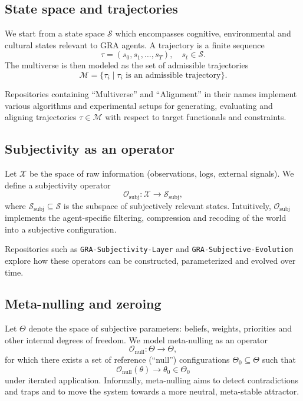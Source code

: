 \documentclass[11pt,a4paper]{article}
\begin{document}
\subsection{State space and trajectories}

We start from a state space $\mathcal{S}$ which encompasses cognitive,
environmental and cultural states relevant to GRA agents.
A trajectory is a finite sequence
\[
  \tau = (s_0, s_1, \dots, s_T), \quad s_t \in \mathcal{S}.
\]
The multiverse is then modeled as the set of admissible trajectories
\[
  \mathcal{M} = \{ \tau_i \mid \tau_i \text{ is an admissible trajectory} \}.
\]

Repositories containing ``Multiverse'' and ``Alignment'' in their names
implement various algorithms and experimental setups for generating,
evaluating and aligning trajectories $\tau \in \mathcal{M}$ with respect
to target functionals and constraints.

\subsection{Subjectivity as an operator}

Let $\mathcal{X}$ be the space of raw information (observations, logs,
external signals).
We define a subjectivity operator
\[
  \mathcal{O}_{\text{subj}} : \mathcal{X} \rightarrow \mathcal{S}_{\text{subj}},
\]
where $\mathcal{S}_{\text{subj}} \subseteq \mathcal{S}$ is the subspace
of subjectively relevant states.
Intuitively, $\mathcal{O}_{\text{subj}}$ implements the agent-specific
filtering, compression and recoding of the world into a subjective
configuration.

Repositories such as \texttt{GRA-Subjectivity-Layer} and
\texttt{GRA-Subjective-Evolution} explore how these operators can be
constructed, parameterized and evolved over time.

\subsection{Meta-nulling and zeroing}

Let $\Theta$ denote the space of subjective parameters:
beliefs, weights, priorities and other internal degrees of freedom.
We model meta-nulling as an operator
\[
  \mathcal{O}_{\text{null}} : \Theta \rightarrow \Theta,
\]
for which there exists a set of reference (``null'') configurations
$\Theta_0 \subseteq \Theta$ such that
\[
  \mathcal{O}_{\text{null}}(\theta) \rightarrow \theta_0 \in \Theta_0
\]
under iterated application.
Informally, meta-nulling aims to detect contradictions and traps and to
move the system towards a more neutral, meta-stable attractor.
\end{document}
